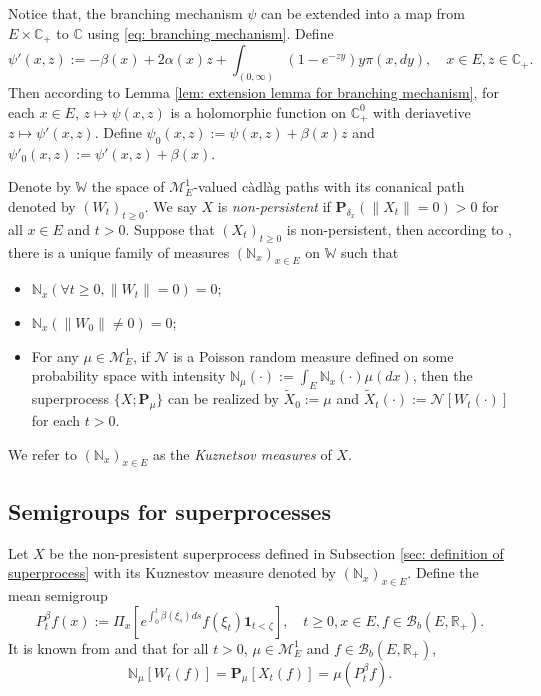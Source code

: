 \documentclass[12pt]{amsart}
\theoremstyle{plain}
\theoremstyle{definition}
\numberwithin{equation}{section}
\begin{document}
    Notice that, the branching mechanism $\psi$ can be extended into a map from $E \times \mathbb C_+$ to $\mathbb C$ using \eqref{eq: branching mechanism}.
    Define
\begin{equation}
    \psi'(x,z):= - \beta(x) + 2\alpha(x) z + \int_{(0,\infty)} (1-e^{-zy})y\pi(x,dy),
    \quad x\in E, z\in \mathbb C_+.
\end{equation}
    Then according to Lemma \ref{lem: extension lemma for branching mechanism}, for each $x \in E$, $z \mapsto \psi(x,z)$ is a holomorphic function on $\mathbb C_+^0$ with deriavetive $z \mapsto \psi'(x,z)$.
    Define $\psi_0(x,z) := \psi(x,z)+ \beta(x)z $ and $\psi'_0(x,z) := \psi'(x,z) + \beta(x)$.

    Denote by $\mathbb W$ the space of $\mathcal M_E^1$-valued c\`{a}dl\`{a}g paths with its conanical path denoted by $(W_t)_{t\geq 0}$.
    We say $X$ is \emph{non-persistent} if $\mathbf P_{\delta_x}(\|X_t\|= 0) > 0$ for all $x\in E$ and $t> 0$.
    Suppose that $(X_t)_{t\geq 0}$ is non-persistent, then according to \cite[Section 8.4]{Li2011Measure-valued},
    there is a unique family of measures $(\mathbb N_x)_{x\in E}$ on $\mathbb W$ such that
\begin{itemize}
\item
    $\mathbb N_x (\forall t \geq 0, \|W_t\|=0) =0$;
\item
    $\mathbb N_x(\|W_0 \|\neq 0) = 0$;
\item
    For any $\mu \in \mathcal M_E^1$, if $\mathcal N$ is a Poisson random measure defined on some probability space
    with intensity $\mathbb N_\mu(\cdot):= \int_E \mathbb N_x(\cdot )\mu(dx)$,
    then the superprocess $\{X;\mathbf P_\mu\}$ can be realized by $\widetilde X_0 := \mu$ and $\widetilde X_t(\cdot) := \mathcal N[W_t(\cdot)]$ for each $t>0$.
\end{itemize}
    We refer to $(\mathbb N_x)_{x\in E}$ as the \emph{Kuznetsov measures} of $X$.
\subsection{{Semigroups for superprocesses}}
\label{sec: definition of vf}
    Let $X$ be the non-presistent superprocess defined in Subsection \ref{sec: definition of superprocess} with its Kuznestov measure denoted by $(\mathbb N_x)_{x\in E}$.
    Define the mean semigroup
\begin{equation}
    P_t^\beta f(x)
    := \Pi_{x}[e^{\int_0^t \beta(\xi_s)ds}f(\xi_t) \mathbf 1_{t< \zeta}],
    \quad t\geq 0, x\in E, f\in \mathcal B_b(E,\mathbb R_+).
\end{equation}
    It is known from \cite[Proposition 2.27]{Li2011Measure-valued} and \cite[Theorem 2.7]{Kyprianou2014Fluctuations} that for all $t > 0$, $\mu \in \mathcal M_E^1$ and $f\in \mathcal B_b(E,\mathbb R_+)$,
\begin{equation}
\label{eq: mean formula for superprocesses}
    \mathbb N_{\mu}[W_t(f)]
    =\mathbf P_{\mu}[X_t(f)]=\mu(P^\beta_t f).
\end{equation}
    
\end{document}
